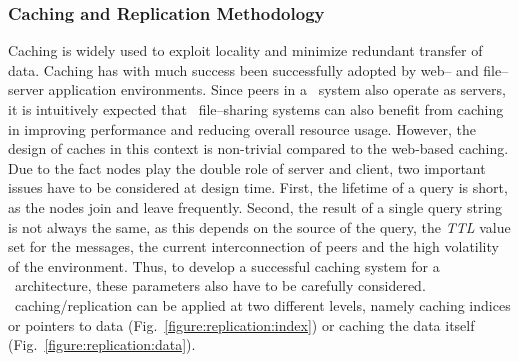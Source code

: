 \subsubsection{Caching and Replication Methodology}

Caching is widely used to exploit locality and minimize redundant
transfer of data. Caching has with much success been successfully 
adopted by web-- and file--server application environments. 
Since peers in a \p\ system also operate as servers,
it is intuitively expected that \p\ file--sharing systems can also benefit from
caching in improving performance and reducing overall resource usage. 
However, the design of caches in this context 
is non-trivial compared to the web-based caching. 
Due to the fact nodes play the double role of server and client,
two important issues have to be considered at design time. 
First, the lifetime of a query is short, as the nodes join 
and leave frequently. Second, the result
of a single query string is not always the same, as this depends on the
source of the query, the \emph{TTL} value set for the messages, 
the current interconnection of peers and the 
high volatility of the environment. 
Thus, to develop a successful caching system for a \p\ architecture, these
parameters also have to be carefully considered. 
\p\ caching/replication can be applied
at two different levels, namely caching indices or pointers to data 
(Fig.~\ref{figure:replication:index}) or caching the data itself 
(Fig.~\ref{figure:replication:data}). 
